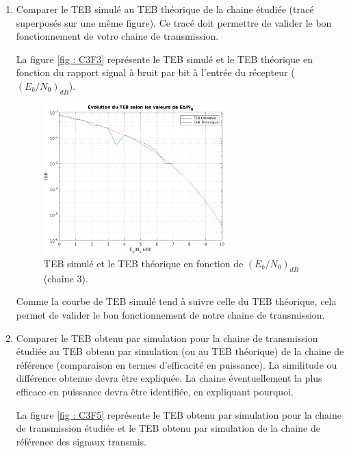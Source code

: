 \documentclass[frenchb]{article}
\begin{document}
\begin{enumerate}
		\par\leavevmode\par
        \item Comparer le TEB simulé au TEB théorique de la chaine étudiée (tracé superposés sur une même figure). Ce tracé doit permettre de valider le bon fonctionnement de votre chaine de transmission.
        \par\leavevmode\par
       	\setlength\parindent{0.5cm}
       	La figure \ref{fig : C3F3} représente le TEB simulé et le TEB théorique en fonction du rapport signal à bruit par bit à l'entrée du récepteur  ($\left(E_b/N_0\right)_{dB}$). 
        
        \begin{figure}[ht!]
		\centering
		\includegraphics[width=7cm]{C3F3.png}		              	    \caption{TEB simulé et le TEB théorique en fonction de $\left(E_b/N_0\right)_{dB}$ (chaîne 3). \label{fig : C2F3}}
		\end{figure}
		\newpage
		Comme la courbe de TEB simulé tend à suivre celle du TEB théorique, cela permet de valider le bon fonctionnement de notre chaine de transmission.
		\par\leavevmode\par
        
        \item Comparer le TEB obtenu par simulation pour la chaine de transmission étudiée au TEB obtenu par simulation (ou au TEB théorique) de la chaine de référence (comparaison en termes d'efficacité en puissance). La similitude ou différence obtenue devra être expliquée. La chaine éventuellement la plus efficace en puissance devra être identifiée, en expliquant pourquoi.
        \par\leavevmode\par
       	\setlength\parindent{0.5cm}
       	La figure \ref{fig : C3F5} représente le TEB obtenu par simulation pour la chaine de transmission étudiée et le TEB obtenu par simulation de la chaine de référence  des signaux transmis.  
        

\end{enumerate}
\end{document}
